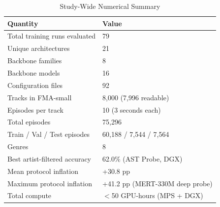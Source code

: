 \documentclass[conference]{IEEEtran}
\begin{document}
\begin{table}[h]
\centering
\footnotesize
\caption{Study-Wide Numerical Summary}
\begin{tabular}{ll}
\toprule
\textbf{Quantity} & \textbf{Value} \\
\midrule
Total training runs evaluated & 79 \\
Unique architectures & 21 \\
Backbone families & 8 \\
Backbone models & 16 \\
Configuration files & 92 \\
Tracks in FMA-small & 8,000 (7,996 readable) \\
Episodes per track & 10 (3 seconds each) \\
Total episodes & 75,296 \\
Train / Val / Test episodes & 60,188 / 7,544 / 7,564 \\
Genres & 8 \\
Best artist-filtered accuracy & 62.0\% (AST Probe, DGX) \\
Mean protocol inflation & +30.8 pp \\
Maximum protocol inflation & +41.2 pp (MERT-330M deep probe) \\
Total compute & $<$50 GPU-hours (MPS + DGX) \\
\bottomrule
\end{tabular}
\end{table}



\end{document}
